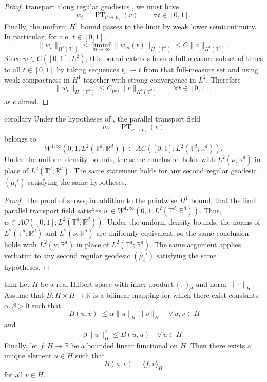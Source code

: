 \documentclass[11pt]{article}
\newcommand{\PT}{\operatorname{PT}}
\begin{document}
\begin{proof}
    transport along regular geodesics \citep[page 104]{ambrosio2012user}, we must have
    \[
    w_t = \PT_{\nu\to\mu_t}(v)
    \qquad\forall t\in[0,1].
    \]
    Finally, the uniform $H^1$ bound passes to the limit by weak lower semicontinuity. In particular, for a.e.
    $t\in[0,1]$,
    \[
    \|w_t\|_{H^1(\mathbb T^d)}
    \le \liminf_{m\to\infty}\|w_m(t)\|_{H^1(\mathbb T^d)}
    \le C\|v\|_{H^1(\mathbb T^d)}.
    \]
    Since $w\in C([0,1];L^2)$, this bound extends from a full-measure subset of times to all
    $t\in[0,1]$ by taking sequences $t_n\to t$ from that full-measure set and using weak compactness
    in $H^1$ together with strong convergence in $L^2$. Therefore
    \[
    \|w_t\|_{H^1(\mathbb T^d)} \le C_{\mathrm{par}}\|v\|_{H^1(\mathbb T^d)}
    \qquad\forall t\in[0,1],
    \]
    as claimed.
\end{proof}

\begin{restatable}{corollary}{} \label{lem:pt_ac}
    Under the hypotheses of , the parallel transport field \[w_t=\PT_{\nu\to\mu_t}(v)\] belongs to
    \[
    W^{1,\infty}(0,1;L^2(\mathbb T^d;\mathbb R^d))
    \subset AC([0,1];L^2(\mathbb T^d;\mathbb R^d)).
    \]
    Under the uniform density bounds, the same conclusion holds with
    $L^2(\nu;\mathbb R^d)$ in place of $L^2(\mathbb T^d;\mathbb R^d)$.
    The same statement holds for any second regular geodesic $(\mu_t')$ satisfying the
    same hypotheses.
\end{restatable}
\begin{proof}
The proof of  shows, in addition to the pointwise $H^1$ bound,
that the limit parallel transport field satisfies $w \in W^{1,\infty}(0,1;L^2(\mathbb T^d;\mathbb R^d)).$ Thus, $w \in AC([0,1];L^2(\mathbb T^d;\mathbb R^d)).$ Under the uniform density bounds, the norms of
$L^2(\mathbb T^d;\mathbb R^d)$ and $L^2(\nu;\mathbb R^d)$ are uniformly
equivalent, so the same conclusion holds with $L^2(\nu;\mathbb R^d)$ in place
of $L^2(\mathbb T^d;\mathbb R^d)$. The same argument applies verbatim to any
second regular geodesic $(\mu_t')$ satisfying the same hypotheses.
\end{proof}


\begin{restatable}{thm}{} \label{lax-milgram}
    Let $H$ be a real Hilbert space with inner product $\langle \cdot, \cdot \rangle_H$ and norm $\|\cdot \|_H$. Assume that $B: H \times H \rightarrow \mathbb{R}$ is a bilinear mapping for which there exist constants $\alpha, \beta > 0$ such that 
    \[|B(u, v)| \leq \alpha \|u\|_H\|v\|_H \quad \forall\, u,v \in H\]
    and 
    \[\beta \|u\|^2_H \leq B(u, u) \quad \forall \, u \in H.\]
    Finally, let $f: H \rightarrow \mathbb{R}$ be a bounded linear functional on $H$. Then there exists a unique element $u \in H$ such that 
    \[B(u, v) = \langle f, v\rangle_H\]
    for all $v \in H.$
\end{restatable}
\end{document}
